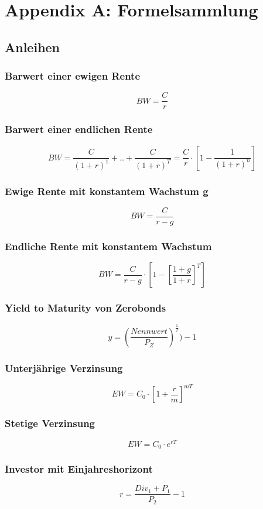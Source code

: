 \section{Appendix A: Formelsammlung}

\subsection{Anleihen}

\subsubsection{Barwert einer ewigen Rente}
\[BW = \frac{C}{r}\]

\subsubsection{Barwert einer endlichen Rente}
\[BW = \frac{C}{(1+r)^1}+..+\frac{C}{(1+r)^T} = \frac{C}{r}\cdot[1-\frac{1}{(1+r)^n}]\]

\subsubsection{Ewige Rente mit konstantem Wachstum g}
\[BW = \frac{C}{r-g}\]

\subsubsection{Endliche Rente mit konstantem Wachstum}
\[BW = \frac{C}{r-g} \cdot [1-[\frac{1+g}{1+r}]^T]\]

\subsubsection{Yield to Maturity von Zerobonds}
\[y = (\frac{Nennwert}{P_Z})^{\frac{1}{T}})-1\]

\subsubsection{Unterjährige Verzinsung}
\[EW=C_0\cdot[1+\frac{r}{m}]^{mT}\]

\subsubsection{Stetige Verzinsung}
\[EW=C_0\cdot e^{rT}\]

\subsubsection{Investor mit Einjahreshorizont}
\[r = \frac{Div_1+P_1}{P_2}-1\]

